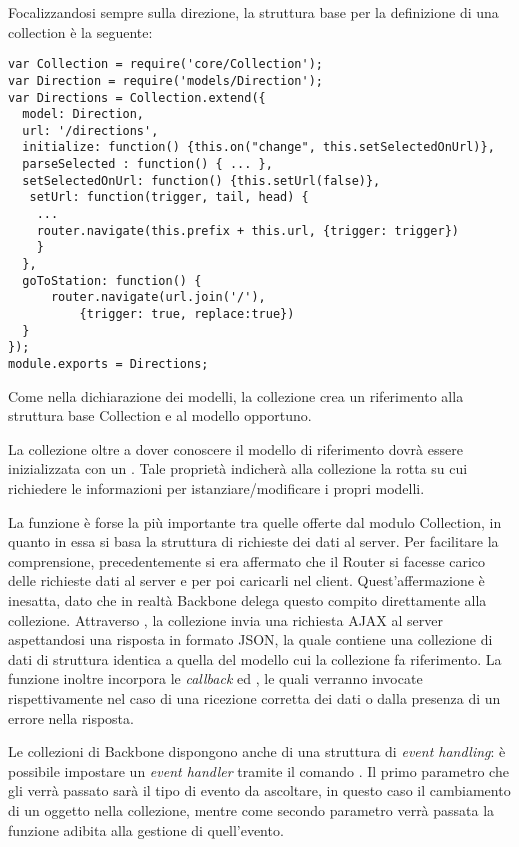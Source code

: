 Focalizzandosi sempre sulla direzione, la struttura base per la definizione di una collection è la seguente:
{\footnotesize
\begin{verbatim}
var Collection = require('core/Collection');
var Direction = require('models/Direction');
var Directions = Collection.extend({
  model: Direction,
  url: '/directions',
  initialize: function() {this.on("change", this.setSelectedOnUrl)},
  parseSelected : function() { ... },    
  setSelectedOnUrl: function() {this.setUrl(false)},
   setUrl: function(trigger, tail, head) {
    ...
    router.navigate(this.prefix + this.url, {trigger: trigger})
    }   
  },
  goToStation: function() {
      router.navigate(url.join('/'), 
          {trigger: true, replace:true})
  }
});
module.exports = Directions;
\end{verbatim}
}
\newpage
Come nella dichiarazione dei modelli, la collezione crea un riferimento alla struttura base Collection e al modello opportuno.

La collezione oltre a dover conoscere il modello di riferimento dovrà essere inizializzata con un . Tale proprietà indicherà alla collezione la rotta su cui richiedere le informazioni per istanziare/modificare i propri modelli.

La funzione  è forse la più importante tra quelle offerte dal modulo Collection, in quanto in essa si basa la struttura di richieste dei dati al server. Per facilitare la comprensione, precedentemente si era affermato che il Router si facesse carico delle richieste dati al server e per poi caricarli nel client. Quest'affermazione è inesatta, dato che in realtà Backbone delega questo compito direttamente alla collezione. Attraverso , la collezione invia una richiesta AJAX al server aspettandosi una risposta in formato JSON, la quale contiene una collezione di dati di struttura identica a quella del modello cui la collezione fa riferimento.
La funzione  inoltre incorpora le {\itshape callback}  ed , le quali verranno invocate rispettivamente nel caso di una ricezione corretta dei dati o dalla presenza di un errore nella risposta.

Le collezioni di Backbone dispongono anche di una struttura di {\itshape event handling}: è possibile impostare un {\itshape event handler} tramite il comando . Il primo parametro che gli verrà passato sarà il tipo di evento da ascoltare, in questo caso il cambiamento di un oggetto nella collezione, mentre come secondo parametro verrà passata la funzione adibita alla gestione di quell'evento.

